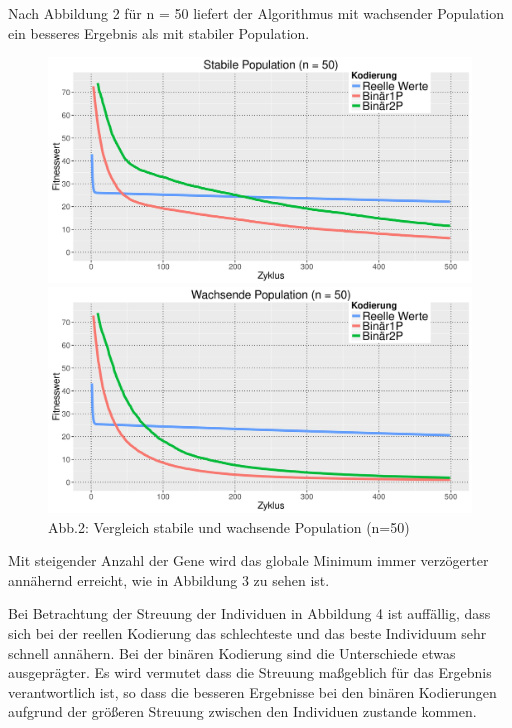 \documentclass[12pt,
    a4paper,
    headinclude,
    footinclude]{scrreprt}
\begin{document}
Nach Abbildung 2 für n = 50 liefert der Algorithmus mit wachsender Population ein besseres Ergebnis als mit stabiler Population.

\begin{figure}[H]
	\centering
	\begin{minipage}[b]{0.45\textwidth}
		\includegraphics[width=\textwidth]{../abb2_stable.jpeg}
	\end{minipage}
	\hfill
	\begin{minipage}[b]{0.45\textwidth}
		\includegraphics[width=\textwidth]{../abb2_growing.jpeg}
	\end{minipage}
	\caption*{Abb.2: Vergleich stabile und wachsende Population (n=50)} 
\end{figure}

Mit steigender Anzahl der Gene wird das globale Minimum immer verzögerter annähernd erreicht, wie in Abbildung 3 zu sehen ist.

Bei Betrachtung der Streuung der Individuen in Abbildung 4 ist auffällig, dass sich bei der reellen Kodierung das schlechteste und das beste Individuum sehr schnell annähern. Bei der binären Kodierung sind die Unterschiede etwas ausgeprägter. Es wird vermutet dass die Streuung maßgeblich für das Ergebnis verantwortlich ist, so dass die besseren Ergebnisse bei den binären Kodierungen aufgrund der größeren Streuung zwischen den Individuen zustande kommen.
\end{document}
